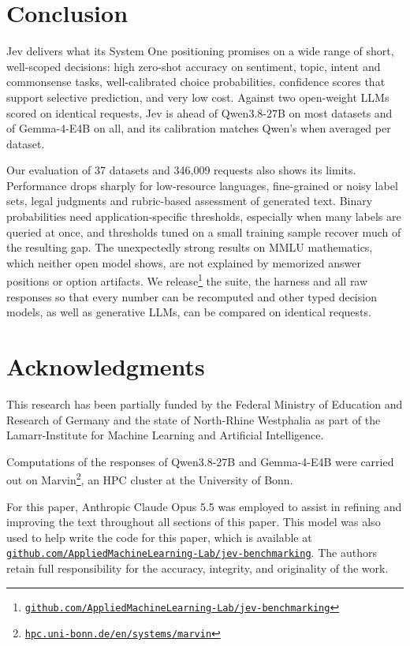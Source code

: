 \documentclass[table]{article}
\begin{document}
\section{Conclusion}

Jev delivers what its System One positioning promises on a wide range of short, well-scoped decisions: high zero-shot accuracy on sentiment, topic, intent and commonsense tasks, well-calibrated choice probabilities, confidence scores that support selective prediction, and very low cost. Against two open-weight LLMs scored on identical requests, Jev is ahead of Qwen3.8-27B on most datasets and of Gemma-4-E4B on all, and its calibration matches Qwen's when averaged per dataset. 

Our evaluation of 37 datasets and 346{,}009 requests also shows its limits. Performance drops sharply for low-resource languages, fine-grained or noisy label sets, legal judgments and rubric-based assessment of generated text. Binary probabilities need application-specific thresholds, especially when many labels are queried at once, and thresholds tuned on a small training sample recover much of the resulting gap. The unexpectedly strong results on MMLU mathematics, which neither open model shows, are not explained by memorized answer positions or option artifacts. We release\footnote{\texttt{\href{https://github.com/AppliedMachineLearning-Lab/jev-benchmarking}{github.com/AppliedMachineLearning-Lab/jev-benchmarking}}} the suite, the harness and all raw responses so that every number can be recomputed and other typed decision models, as well as generative LLMs, can be compared on identical requests.

\section*{Acknowledgments}

This research has been partially funded by the Federal Ministry of Education and Research of Germany and the state of North-Rhine Westphalia as part of the Lamarr-Institute for Machine Learning and Artificial Intelligence.

Computations of the responses of Qwen3.8-27B and Gemma-4-E4B were carried out on Marvin\footnote{\texttt{\href{https://www.hpc.uni-bonn.de/en/systems/marvin}{hpc.uni-bonn.de/en/systems/marvin}}}, an HPC cluster at the University of Bonn.

For this paper, Anthropic Claude Opus 5.5 \cite{anthropic2026opus55} was employed to assist in refining and improving the text throughout all sections of this paper. This model was also used to help write the code for this paper, which is available at \texttt{\href{https://github.com/AppliedMachineLearning-Lab/jev-benchmarking}{github.com/AppliedMachineLearning-Lab/jev-benchmarking}}. The authors retain full responsibility for the accuracy, integrity, and originality of the work.
\end{document}
